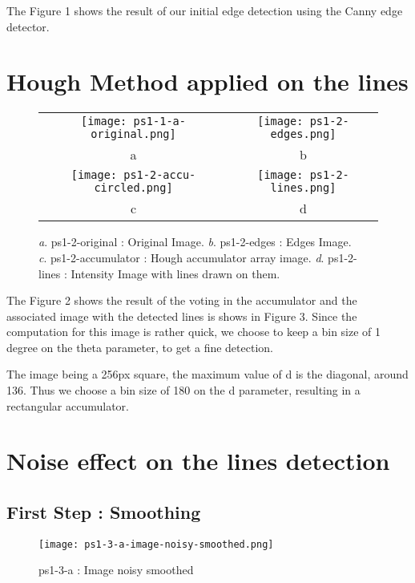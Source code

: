 \documentclass[a4paper,11pt]{article}
\begin{document}
The Figure 1 shows the result of our initial edge detection using the Canny edge detector.

\section{Hough Method applied on the lines}

 \begin{figure}[H]
\begin{center}
\begin{tabular}{cc}
	\texttt{[image: ps1-1-a-original.png]}&
	\texttt{[image: ps1-2-edges.png]}\\
	a&b\\
	\texttt{[image: ps1-2-accu-circled.png]}&
	\texttt{[image: ps1-2-lines.png]}\\
	c&d\\
\end{tabular}
\end{center}
\caption{ 
\textit{a}. ps1-2-original : Original Image.  \textit{b}. ps1-2-edges : Edges Image. \\
\textit{c}. ps1-2-accumulator : Hough accumulator array image. \textit{d}. ps1-2-lines : Intensity Image with lines drawn on them.}
\label{ps1-2}
\end{figure}

The Figure 2 shows the result of the voting in the accumulator and the associated image with the detected lines is shows in Figure 3.
Since the computation for this image is rather quick, we choose to keep a bin size of 1 degree on the theta parameter, to get a fine detection.
   
The image being a 256px square, the maximum value of d is the diagonal, around 136. Thus we choose a bin size of 180 on the d parameter, resulting in a rectangular accumulator.


\section{Noise effect on the lines detection}


\subsection{First Step : Smoothing}

\begin{figure}[H]
\centering
\texttt{[image: ps1-3-a-image-noisy-smoothed.png]}
 \caption{ps1-3-a : Image noisy smoothed }
\label{ps1-3-a}
\end{figure}
\end{document}
